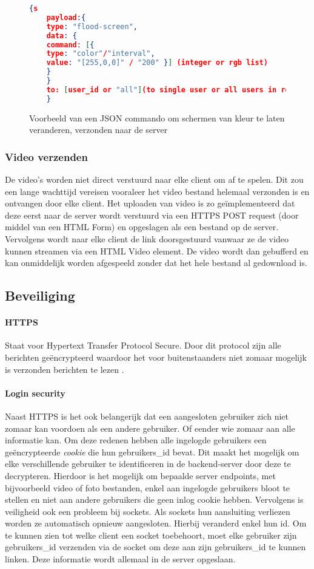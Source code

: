 \begin{figure} [h]
    \begin{lstlisting}[language=json,firstnumber=1]
    {s
    payload:{
    type: "flood-screen",
    data: {
    command: [{
    type: "color"/"interval",
    value: "[255,0,0]" / "200" }] (integer or rgb list)
    }
    }
    to: [user_id or "all"](to single user or all users in room)
    }

    \end{lstlisting}
    \caption{Voorbeeld van een JSON commando om schermen van kleur te laten veranderen, verzonden naar de server} \label{jsonScreenCommand}
\end{figure}

\subsubsection{Video verzenden}
De video's worden niet direct verstuurd naar elke client om af te spelen. Dit zou een lange wachttijd vereisen vooraleer het video bestand helemaal verzonden is en ontvangen door elke client.
Het uploaden van video is zo geïmplementeerd dat deze eerst naar de server wordt verstuurd via een HTTPS POST request (door middel van een HTML Form) en opgeslagen als een bestand op de server. Vervolgens wordt naar elke client de link doorsgestuurd vanwaar ze de video kunnen streamen via een HTML Video element. De video wordt dan gebufferd en kan onmiddelijk worden afgespeeld zonder dat het hele bestand al gedownload is.

\subsection{Beveiliging}
\paragraph{HTTPS} Staat voor Hypertext Transfer Protocol Secure. Door dit protocol zijn alle berichten geëncrypteerd waardoor het voor buitenstaanders niet zomaar mogelijk is verzonden berichten te lezen .
\paragraph{Login security} Naast HTTPS is het ook belangerijk dat een aangesloten gebruiker zich niet zomaar kan voordoen als een andere gebruiker. Of eender wie zomaar aan alle informatie kan. Om deze redenen hebben alle ingelogde gebruikers een geëncrypteerde \textit{cookie} die hun gebruikers\_id bevat. Dit maakt het mogelijk om elke verschillende gebruiker te identificeren in de backend-server door deze te decrypteren. Hierdoor is het mogelijk om bepaalde server endpoints, met bijvoorbeeld video of foto bestanden, enkel aan ingelogde gebruikers bloot te stellen en niet aan andere gebruikers die geen inlog cookie hebben.
Vervolgens is veiligheid ook een probleem bij sockets. Als sockets hun aansluiting verliezen worden ze automatisch opnieuw aangesloten. Hierbij veranderd enkel hun id. Om te kunnen zien tot welke client een socket toebehoort, moet elke gebruiker zijn gebruikers\_id verzenden via de socket om deze aan zijn gebruikers\_id te kunnen linken. Deze informatie wordt allemaal in de server opgeslaan.

